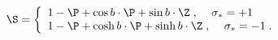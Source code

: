 \begin{equation}
\label{e5:33}
\S= \left\{\begin{array}{l}
1-\P+\cos b \cdot \P + \sin b\cdot \Z \; \mbox{, } \quad \sigma_{\ast}=+1\\ 
1-\P+\cosh b \cdot \P + \sinh b\cdot \Z \; \mbox{, }\quad \sigma_{\ast}=-1 \; .
\end{array}\right.
\end{equation}

